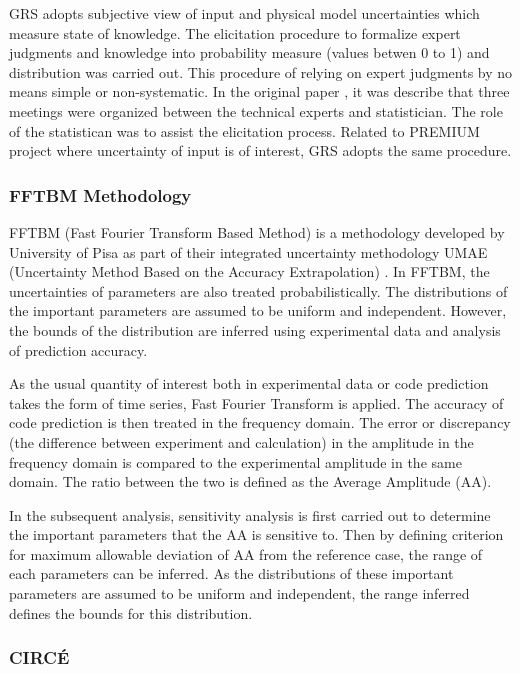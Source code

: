 \documentclass[11pt,titlepage]{article}
\begin{document}
GRS adopts subjective view of input and physical model uncertainties which measure state of knowledge.
The elicitation procedure to formalize expert judgments and knowledge into probability measure (values betwen 0 to 1) and distribution was carried out.
This procedure of relying on expert judgments by no means simple or non-systematic.
In the original paper \cite{Glaeser1994}, it was describe that three meetings were organized between the technical experts and statistician.
The role of the statistican was to assist the elicitation process.
Related to PREMIUM project where uncertainty of input is of interest, GRS adopts the same procedure.

\subsubsection{FFTBM Methodology}

FFTBM (Fast Fourier Transform Based Method) is a methodology developed by University of Pisa as part of their integrated uncertainty methodology UMAE (Uncertainty Method Based on the Accuracy Extrapolation) \cite{Prosek2002,DAuria1998}.
In FFTBM, the uncertainties of parameters are also treated probabilistically.
The distributions of the important parameters are assumed to be uniform and independent. 
However, the bounds of the distribution are inferred using experimental data and analysis of prediction accuracy.

As the usual quantity of interest both in experimental data or code prediction takes the form of time series, Fast Fourier Transform is applied. 
The accuracy of code prediction is then treated in the frequency domain.
The error or discrepancy (the difference between experiment and calculation) in the amplitude in the frequency domain is compared to the experimental amplitude in the same domain.
The ratio between the two is defined as the Average Amplitude (AA).

In the subsequent analysis, sensitivity analysis is first carried out to determine the important parameters that the AA is sensitive to. 
Then by defining criterion for maximum allowable deviation of AA from the reference case, the range of each parameters can be inferred.
As the distributions of these important parameters are assumed to be uniform and independent, the range inferred defines the bounds for this distribution.

\subsubsection{CIRCÉ}
\end{document}
